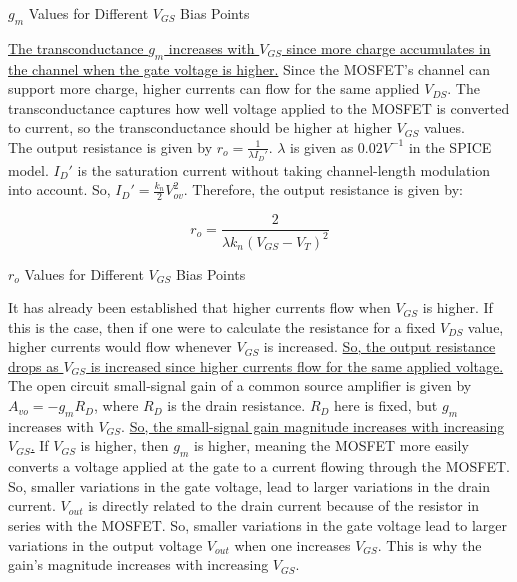 \FloatBarrier

\begin{table}[h!]
	\centering
	\caption{$g_m$ Values for Different $V_{GS}$ Bias Points}
	\label{tab:ss_gm}
\end{table}

\FloatBarrier

\uline{The transconductance $g_m$ increases with $V_{GS}$ since more charge accumulates in the channel when the gate voltage is higher.} Since the MOSFET's channel can support more charge, higher currents can flow for the same applied $V_{DS}$. The transconductance captures how well voltage applied to the MOSFET is converted to current, so the transconductance should be higher at higher $V_{GS}$ values. \\

The output resistance is given by $r_o = \frac{1}{\lambda I_D'}$. $\lambda$ is given as $0.02 V^{-1}$ in the SPICE model. $I_D'$ is the saturation current without taking channel-length modulation into account. So, $I_D' = \frac{k_n}{2} V_{ov}^2$. Therefore, the output resistance is given by:

\begin{equation}
	\label{eq:output_r}
	r_o = \frac{2}{\lambda k_n ( V_{GS} - V_T )^2}
\end{equation}

\FloatBarrier

\begin{table}[h!]
	\centering
	\caption{$r_o$ Values for Different $V_{GS}$ Bias Points}
	\label{tab:ss_ro}
\end{table}

\FloatBarrier

It has already been established that higher currents flow when $V_{GS}$ is higher. If this is the case, then if one were to calculate the resistance for a fixed $V_{DS}$ value, higher currents would flow whenever $V_{GS}$ is increased. \uline{So, the output resistance drops as $V_{GS}$ is increased since higher currents flow for the same applied voltage.} \\

The open circuit small-signal gain of a common source amplifier is given by $A_{vo} = -g_m R_D$, where $R_D$ is the drain resistance. $R_D$ here is fixed, but $g_m$ increases with $V_{GS}$. \uline{So, the small-signal gain magnitude increases with increasing $V_{GS}$.} If $V_{GS}$ is higher, then $g_m$ is higher, meaning the MOSFET more easily converts a voltage applied at the gate to a current flowing through the MOSFET. So, smaller variations in the gate voltage, lead to larger variations in the drain current. $V_{out}$ is directly related to the drain current because of the resistor in series with the MOSFET. So, smaller variations in the gate voltage lead to larger variations in the output voltage $V_{out}$ when one increases $V_{GS}$. This is why the gain's magnitude increases with increasing $V_{GS}$.

